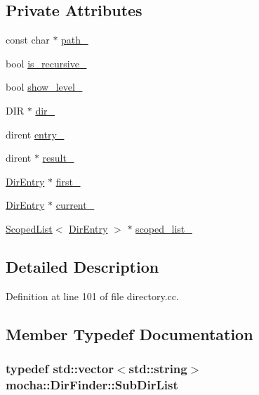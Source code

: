 \subsection*{Private Attributes}
\begin{DoxyCompactItemize}
\item 
const char $\ast$ \hyperlink{classmocha_1_1_dir_finder_a1ef92d885780984ecb7b82ba9b4b5543}{path\_\-}
\item 
bool \hyperlink{classmocha_1_1_dir_finder_a2b47a8b8bd03f5af49a5dd5058d13b3a}{is\_\-recursive\_\-}
\item 
bool \hyperlink{classmocha_1_1_dir_finder_aa050793a3b04ea0b57a6971085f85969}{show\_\-level\_\-}
\item 
DIR $\ast$ \hyperlink{classmocha_1_1_dir_finder_a28e4e804d01d3b22fdcd3c24de664a80}{dir\_\-}
\item 
dirent \hyperlink{classmocha_1_1_dir_finder_aad8c41bba9d05cb0b0c4d96cee2e0d14}{entry\_\-}
\item 
dirent $\ast$ \hyperlink{classmocha_1_1_dir_finder_aaab8894e08b3e4cd81e4df5b4157c2c2}{result\_\-}
\item 
\hyperlink{classmocha_1_1_dir_entry}{DirEntry} $\ast$ \hyperlink{classmocha_1_1_dir_finder_a65235eb369e6a960d885fce284d25400}{first\_\-}
\item 
\hyperlink{classmocha_1_1_dir_entry}{DirEntry} $\ast$ \hyperlink{classmocha_1_1_dir_finder_a2d94dc19bbaa238b3e3a57f42e52cd14}{current\_\-}
\item 
\hyperlink{classmocha_1_1_scoped_list}{ScopedList}$<$ \hyperlink{classmocha_1_1_dir_entry}{DirEntry} $>$ $\ast$ \hyperlink{classmocha_1_1_dir_finder_aec3cfce5cc65650949d6ba339832492a}{scoped\_\-list\_\-}
\end{DoxyCompactItemize}


\subsection{Detailed Description}


Definition at line 101 of file directory.cc.



\subsection{Member Typedef Documentation}
\hypertarget{classmocha_1_1_dir_finder_abd8c8f76dbb9c9ac8a3810d99a9f10e8}{
\subsubsection[{SubDirList}]{\setlength{\rightskip}{0pt plus 5cm}typedef std::vector$<$std::string$>$ {\bf mocha::DirFinder::SubDirList}}}
\label{classmocha_1_1_dir_finder_abd8c8f76dbb9c9ac8a3810d99a9f10e8}


